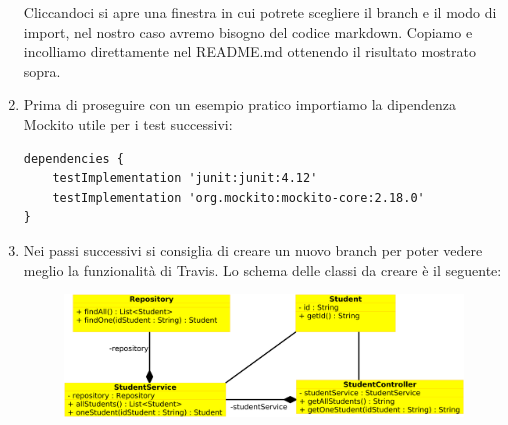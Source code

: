 \begin{enumerate}
\begin{figure}[H]
  \end{figure}
  Cliccandoci si apre una finestra in cui potrete scegliere il branch e il modo di import, nel nostro caso avremo bisogno del codice markdown. Copiamo e incolliamo direttamente nel README.md ottenendo il risultato mostrato sopra.
  \item Prima di proseguire con un esempio pratico importiamo la dipendenza Mockito utile per i test successivi:
  \begin{lstlisting}[frame=single]
dependencies {
    testImplementation 'junit:junit:4.12'
    testImplementation 'org.mockito:mockito-core:2.18.0'
}\end{lstlisting}
    \item Nei passi successivi si consiglia di creare un nuovo branch per poter vedere meglio la funzionalità di Travis. Lo schema delle classi da creare è il seguente:
    \begin{figure}[H]
    \centering
    \includegraphics[width=0.8\linewidth]{4IntegrationWithOtherTool/tutorial/classDiagram.png}
  \end{figure}
\end{enumerate}